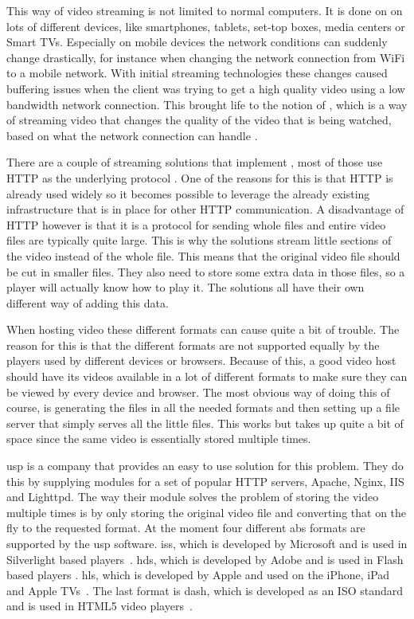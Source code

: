 \documentclass[twoside,openright]{uva-bachelor-thesis}
\begin{document}
This way of video streaming is not limited to normal computers. It is done on on
lots of different devices, like smartphones, tablets, set-top boxes,
media centers or Smart TVs. Especially on mobile devices the network conditions
can suddenly change drastically, for instance when changing the network
connection from WiFi to a mobile network. With initial streaming technologies
these changes caused buffering issues when the client was trying to get a high
quality video using a low bandwidth network connection. This brought life to the
notion of \abs, which is a way of streaming video that changes the quality
of the video that is being watched, based on what the network connection can
handle \autocite{abs}.

There are a couple of streaming solutions that implement \abs, most of
those use HTTP as the underlying protocol \autocite{http}.  One of the reasons
for this is that HTTP is already used widely so it becomes possible to
leverage the already existing infrastructure that is in place for other HTTP
communication. A disadvantage of HTTP however is that it is a protocol for
sending whole files and entire video files are typically quite large. This is
why the solutions stream little sections of the video instead of the whole file.
This means that the original video file should be cut in smaller files. They
also need to store some extra data in those files, so a player will actually
know how to play it. The solutions all have their own different way of adding
this data.

When hosting video these different formats can cause quite a bit of trouble.
The reason for this is that the different formats are not supported equally by
the players used by different devices or browsers. Because of this, a good video
host should have its videos available in a lot of different formats to make sure
they can be viewed by every device and browser. The most obvious way of doing
this of course, is generating the files in all the needed formats and then
setting up a file server that simply serves all the little files. This works but
takes up quite a bit of space since the same video is essentially stored
multiple times.

\Gls{usp} is a company that provides an easy to use solution for this problem.
They do this by supplying modules for a set of popular HTTP servers, Apache,
Nginx, IIS and Lighttpd. The way their module solves the problem of storing the
video multiple times is by only storing the original video file and converting
that on the fly to the requested format. At the moment four different \gls{abs}
formats are supported by the \gls{usp} software. \Gls{iss}, which is developed
by Microsoft and is used in Silverlight based players~\autocites{iss}{iss2}.
\Gls{hds}, which is developed by Adobe and is used in Flash based players
\autocite{hds}.  \Gls{hls}, which is developed by Apple and used on the iPhone,
iPad and Apple TVs~\autocite{hls}. The last format is \gls{dash}, which is
developed as an ISO standard and is used in \textsc{HTML5} video
players~\autocites{dash}{dash2}.
\end{document}
